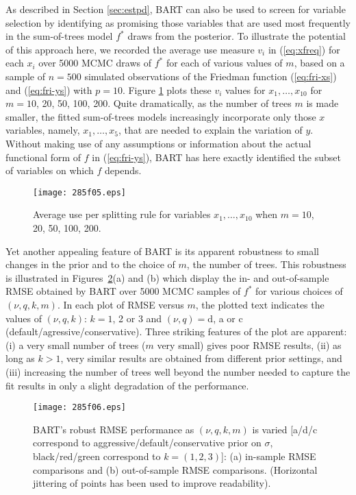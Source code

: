 \documentclass[aoas,nameyear,dvips]{arximspdf}
\begin{document}
As described in Section \ref{sec:estpd}, BART can also be used to
screen for variable selection by identifying as promising those
variables that are used most frequently in the sum-of-trees model $f^*$
draws from the posterior.   To illustrate the potential of this
approach here, we recorded the average use measure $v_i$ in
(\ref{eq:xfreq}) for each $x_i$ over 5000 MCMC draws of $f^*$ for each
of various values of $m$, based on a sample of $n = 500$ simulated
observations of the Friedman function (\ref{eq:fri-xs}) and
(\ref{eq:fri-ys}) with $p = 10$.  Figure \ref{fig:friedman-varsel}
plots these $v_i$ values for $x_1,\ldots,x_{10}$ for $m =
10$, 20, 50, 100, 200.  Quite dramatically, as the number of trees $m$ is
made smaller, the fitted sum-of-trees models increasingly incorporate
only those $x$ variables, namely, $x_1,\ldots,x_5$, that are needed to
explain the variation of $y$.  Without making use of any assumptions or
information about the actual functional form of $f$ in
(\ref{eq:fri-ys}), BART has here exactly identified the subset of
variables on which $f$ depends.

\begin{figure}

\texttt{[image: 285f05.eps]}

\caption{Average use per splitting rule for variables $x_1,\ldots,x_{10}$ when $m =
10$, 20, 50, 100, 200.} \label{fig:friedman-varsel}
\end{figure}


Yet another appealing feature of BART is its apparent
robustness to small changes in the prior and to the
choice of $m$, the number of trees.   This robustness is illustrated in
Figures~\ref{fig:friedmanmrun1}(a) and (b) which display the in-
and out-of-sample RMSE  obtained by BART over 5000 MCMC samples of $f^*$ for various choices of $(\nu,
q, k, m )$. In each plot of RMSE versus $m$, the plotted text
indicates the values of $(\nu, q, k)$: $k = 1$, 2 or 3 and $(\nu,
q) = \mathrm{d}$, a or c (default/agressive/conservative). Three striking
features of the plot are apparent: (i) a very small number of
trees ($m$ very small) gives poor RMSE results, (ii) as long as $k>1$,
very similar results are obtained from different prior settings,
and (iii) increasing the number of trees well beyond the number
needed to capture the fit results in only a slight degradation of
the performance.

\begin{figure}

\texttt{[image: 285f06.eps]}

 \caption{BART's robust RMSE performance as $(\nu, q, k, m)$ is varied
[a/d/c correspond to aggressive/default/conservative prior on $\sigma$,
black/red/green correspond to $k=(1,2,3)$]: \textup{(a)} in-sample RMSE
comparisons and \textup{(b)} out-of-sample RMSE comparisons. (Horizontal
jittering of points has been used to improve readability).}\label{fig:friedmanmrun1}
\end{figure}
\end{document}
